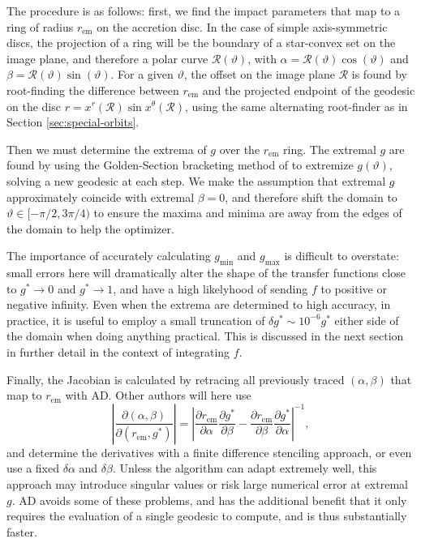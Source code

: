 \documentclass[fleqn,usenatbib]{mnras}
\newcommand{\pderiv}[2]{\frac{\partial #1}{\partial #2}}
\begin{document}
The procedure is as follows: first, we find the impact parameters that map to a
ring of radius $r_\text{em}$ on the accretion disc. In the case of simple
axis-symmetric discs, the projection of a ring will be the boundary of a
star-convex set on the image plane, and therefore a polar curve
$\mathcal{R}(\vartheta)$, with $\alpha = \mathcal{R}(\vartheta) \cos(\vartheta)$
and $\beta = \mathcal{R}(\vartheta) \sin(\vartheta)$. For a given $\vartheta$,
the offset on the image plane $\mathcal{R}$ is found by root-finding the
difference between $r_\text{em}$ and the projected endpoint of the geodesic on
the disc $r = x^r (\mathcal{R}) \sin x^\theta(\mathcal{R})$, using the same
alternating root-finder as in Section \ref{sec:special-orbits}.

Then we must determine the extrema of $g$ over the $r_\text{em}$ ring. The
extremal $g$ are found by using the Golden-Section bracketing method of
\cite{Optim.jl-2018} to extremize $g(\vartheta)$, solving a new geodesic
at each step. We make the assumption that extremal $g$ approximately coincide
with extremal $\beta = 0$, and therefore shift the domain to $\vartheta \in [
-\pi/2, 3\pi/4)$ to ensure the maxima and minima are away from the edges of the
domain to help the optimizer.

The importance of accurately calculating $g_\text{min}$ and $g_\text{max}$ is
difficult to overstate: small errors here will dramatically alter the shape of
the transfer functions close to $g^\ast \rightarrow 0$ and $g^\ast \rightarrow
1$, and have a high likelyhood of sending $f$ to positive or negative infinity.
Even when the extrema are determined to high accuracy, in practice, it is useful
to employ a small truncation of $\delta g^\ast \sim 10^{-6}g^\ast$ either side
of the domain when doing anything practical. This is discussed in the next
section in further detail in the context of integrating $f$.

Finally, the Jacobian is calculated by retracing all previously traced $(\alpha,
\beta)$ that map to $r_\text{em}$ with AD. Other authors will here use
\begin{equation}
    \left\lvert
    \pderiv{(\alpha, \beta)}{(r_\text{em}, g^\ast)}
    \right\rvert
    =
    \left\lvert
    \pderiv{r_\text{em}}{\alpha}\pderiv{g^\ast}{\beta}
    -
    \pderiv{r_\text{em}}{\beta}\pderiv{g^\ast}{\alpha}
    \right\rvert^{-1},
\end{equation}
and determine the derivatives with a finite difference stenciling approach, or
even use a fixed $\delta \alpha$ and $\delta \beta$. Unless the algorithm can
adapt extremely well, this approach may introduce singular values or risk large
numerical error at extremal $g$. AD avoids some of these problems, and has the
additional benefit that it only requires the evaluation of a single geodesic to
compute, and is thus substantially faster.
\end{document}
